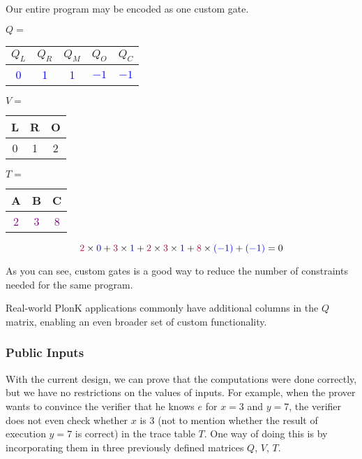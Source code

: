 \documentclass[../lecture-notes.tex]{subfiles}
\begin{document}
\begin{example}
Our entire program may be encoded as one custom gate.
\begin{center}
$Q=$ 
\begin{tabular}{|c|c|c|c|c|}
\hline
\rowcolor{gray!30}$Q_L$ & $Q_R$ & $Q_M$ & $Q_O$ & $Q_C$ \\ 
\hline
\textcolor{blue}{0} & \textcolor{blue}{1} & \textcolor{blue}{1} & \textcolor{blue}{$-1$} & \textcolor{blue}{$-1$} \\ 
\hline
\end{tabular}
\quad $V=$
\begin{tabular}{|c|c|c|}
\hline
\rowcolor{gray!30}L & R & O \\
\hline
0 & 1 & 2 \\
\hline
\end{tabular}
\quad $T=$
\begin{tabular}{|c|c|c|}
\hline
\rowcolor{gray!30}A & B & C \\
\hline
\textcolor{purple}{2} & \textcolor{purple}{3} & \textcolor{purple}{8} \\
\hline
\end{tabular}

\[\textcolor{purple}{2} \times \textcolor{blue}{0} + \textcolor{purple}{3} \times \textcolor{blue}{1} + \textcolor{purple}{2} \times \textcolor{purple}{3} \times \textcolor{blue}{1} + \textcolor{purple}{8} \times \textcolor{blue}{(-1)} + \textcolor{blue}{(-1)} = 0\]
\end{center}
As you can see, custom gates is a good way to reduce the number of constraints needed for the same program.
\end{example}

\begin{remark}
Real-world PlonK applications commonly have additional columns in the $Q$ matrix, enabling an even broader set of custom functionality.
\end{remark}

\subsubsection{Public Inputs}
With the current design, we can prove that the computations were done correctly,
but we have no restrictions on the values of inputs. For example, when the
prover wants to convince the verifier that he knows $e$ for $x=3$ and $y=7$, the
verifier does not even check whether $x$ is $3$ (not to mention whether the
result of execution $y=7$ is correct) in the trace table $T$. One way of doing
this is by incorporating them in three previously defined matrices $Q$, $V$,
$T$.
\end{document}
